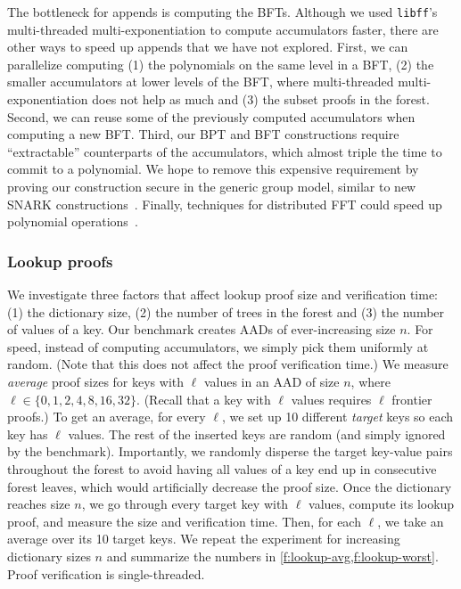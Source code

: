 The bottleneck for appends is computing the BFTs.
Although we used \texttt{libff}'s multi-threaded multi-exponentiation to compute accumulators faster, there are other ways to speed up appends that we have not explored.
First, we can parallelize computing (1) the polynomials on the same level in a BFT, (2) the smaller accumulators at lower levels of the BFT, where multi-threaded multi-exponentiation does not help as much and (3) the subset proofs in the forest.
Second, we can reuse some of the previously computed accumulators when computing a new BFT.
Third, our BPT and BFT constructions require ``extractable'' counterparts of the accumulators, which almost triple the time to commit to a polynomial.
We hope to remove this expensive requirement by proving our construction secure in the generic group model, similar to new SNARK constructions~\cite{groth16}.
Finally, techniques for distributed FFT could speed up polynomial operations~\cite{dizk}.

\subsubsection{Lookup proofs}
\label{s:eval:lookup}
We investigate three factors that affect lookup proof size and verification time: (1) the dictionary size, (2) the number of trees in the forest and (3) the number of values of a key.
Our benchmark creates AADs of ever-increasing size $n$.
For speed, instead of computing accumulators, we simply pick them uniformly at random.
(Note that this does not affect the proof verification time.)
We measure \textit{average} proof sizes for keys with $\ell$ values in an AAD of size $n$, where $\ell \in \{0, 1, 2, 4, 8, 16, 32\}$.
(Recall that a key with $\ell$ values requires $\ell$ frontier proofs.)
To get an average, for every $\ell$, we set up 10 different \textit{target} keys so each key has $\ell$ values.
The rest of the inserted keys are random (and simply ignored by the benchmark).
Importantly, we randomly disperse the target key-value pairs throughout the forest to avoid having all values of a key end up in consecutive forest leaves, which would artificially decrease the proof size.
Once the dictionary reaches size $n$, we go through every target key with $\ell$ values, compute its lookup proof, and measure the size and verification time.
Then, for each $\ell$, we take an average over its 10 target keys.
We repeat the experiment for increasing dictionary sizes $n$ and summarize the numbers in \cref{f:lookup-avg,f:lookup-worst}.
Proof verification is single-threaded.

